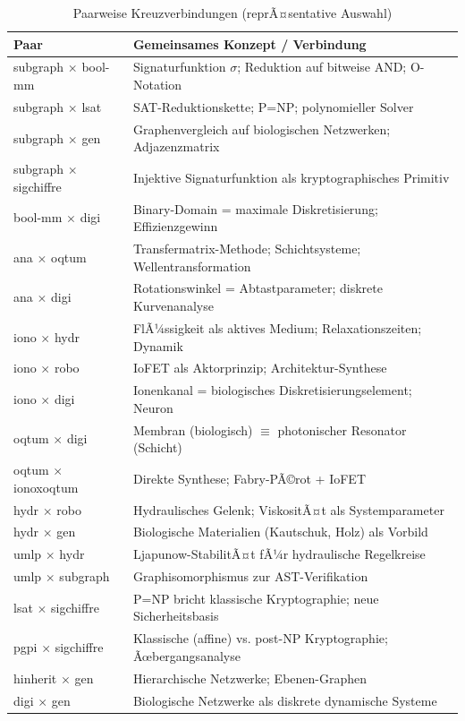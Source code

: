 ﻿\documentclass[a4paper,12pt]{scrreprt}
\theoremstyle{definition}
\begin{document}
\begin{table}[H]
\caption{Paarweise Kreuzverbindungen (reprÃ¤sentative Auswahl)}
\label{tab:cross_matrix}
\small
\begin{tabularx}{\textwidth}{l X}
\toprule
\textbf{Paar} & \textbf{Gemeinsames Konzept / Verbindung} \\
\midrule
subgraph $\times$ bool-mm
  & Signaturfunktion $\sigma$; Reduktion auf bitweise AND; O-Notation \\
subgraph $\times$ lsat
  & SAT-Reduktionskette; P=NP; polynomieller Solver \\
subgraph $\times$ gen
  & Graphenvergleich auf biologischen Netzwerken; Adjazenzmatrix \\
subgraph $\times$ sigchiffre
  & Injektive Signaturfunktion als kryptographisches Primitiv \\
bool-mm $\times$ digi
  & Binary-Domain = maximale Diskretisierung; Effizienzgewinn \\
ana $\times$ oqtum
  & Transfermatrix-Methode; Schichtsysteme; Wellentransformation \\
ana $\times$ digi
  & Rotationswinkel = Abtastparameter; diskrete Kurvenanalyse \\
iono $\times$ hydr
  & FlÃ¼ssigkeit als aktives Medium; Relaxationszeiten; Dynamik \\
iono $\times$ robo
  & IoFET als Aktorprinzip; Architektur-Synthese \\
iono $\times$ digi
  & Ionenkanal = biologisches Diskretisierungselement; Neuron \\
oqtum $\times$ digi
  & Membran (biologisch) $\equiv$ photonischer Resonator (Schicht) \\
oqtum $\times$ ionoxoqtum
  & Direkte Synthese; Fabry-PÃ©rot + IoFET \\
hydr $\times$ robo
  & Hydraulisches Gelenk; ViskositÃ¤t als Systemparameter \\
hydr $\times$ gen
  & Biologische Materialien (Kautschuk, Holz) als Vorbild \\
umlp $\times$ hydr
  & Ljapunow-StabilitÃ¤t fÃ¼r hydraulische Regelkreise \\
umlp $\times$ subgraph
  & Graphisomorphismus zur AST-Verifikation \\
lsat $\times$ sigchiffre
  & P=NP bricht klassische Kryptographie; neue Sicherheitsbasis \\
pgpi $\times$ sigchiffre
  & Klassische (affine) vs. post-NP Kryptographie; Ãœbergangsanalyse \\
hinherit $\times$ gen
  & Hierarchische Netzwerke; Ebenen-Graphen \\
digi $\times$ gen
  & Biologische Netzwerke als diskrete dynamische Systeme \\
\bottomrule
\end{tabularx}
\end{table}
\end{document}
